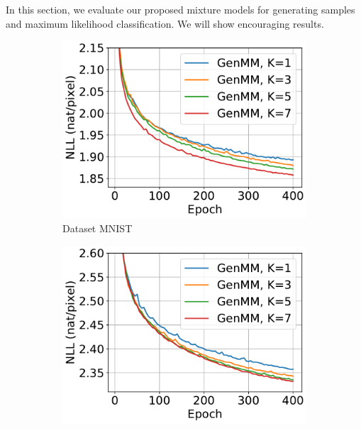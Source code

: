 In this section, we evaluate our proposed mixture models for generating samples and maximum likelihood classification. We will show encouraging results.


\begin{figure}[!t]
  \captionsetup[subfigure]{justification=centering}
  \centering
  \begin{subfigure}{.4\textwidth}
    \centering
    \includegraphics[width=1\linewidth]{images/supply/mnist_GenMM_nll_curves-crop.pdf}
    
    \caption{Dataset MNIST}
    \label{fig-genmm-mnist-nll-curve}
  \end{subfigure}\hspace{1cm}
  \begin{subfigure}{.4\textwidth}
    \centering
    \includegraphics[width=1\linewidth]{images/supply/fashion_GenMM_nll_curves-crop.pdf}
    

\end{subfigure}
\end{figure}
